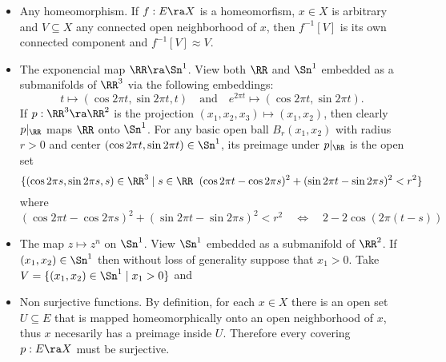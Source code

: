 \begin{examples*} $\;$\\%
\renewcommand{\labelitemi}{$\square$}
\begin{itemize}
\item Any homeomorphism. If $f:E\ra X$ is a homeomorfism, $x\in X$ is arbitrary and $V\subseteq X$ any
  connected open neighborhood of $x$, then $f^{-1}[V]$ is its own connected component and
  $f^{-1}[V]\approx V$.

\item The exponencial map $\RR\ra\Sn^1$.  View both $\RR$ and $\Sn^1$ embedded as a submanifolds of
  $\RR^3$ via the following embeddings:
  \[
    t \mapsto (\cos 2\pi t,\sin 2\pi t,t) \quad\text{and}\quad
    e^{2\pi t} \mapsto (\cos 2\pi t,\sin 2\pi t).
  \]
  If $p:\RR^3\ra\RR^2$ is the projection $(x_1,x_2,x_3)\mapsto(x_1,x_2)$, then clearly
  $p|_{\RR}$ maps $\RR$ onto $\Sn^1$. For any basic open ball $B_r(x_1,x_2)$ with radius
  $r>0$ and center $(\cos 2\pi t,\sin 2\pi t)\in\Sn^1$, its preimage under $p|_{\RR}$ is the open set
  \[
    \{(\cos2\pi s,\sin2\pi s,s)\in\RR^3 \mid
    s\in\RR\;\; (\cos2\pi t -\cos2\pi s)^2+(\sin2\pi t -\sin2\pi s)^2<r^2 \}
  \]
  where
  \[
    (\cos2\pi t -\cos2\pi s)^2+(\sin2\pi t -\sin2\pi s)^2<r^2 \quad\iff\quad
    2-2\cos(2\pi (t-s))
  \]
  
  
  
  
  
\item The map $z\mapsto z^n$ on $\Sn^1$. View $\Sn^1$ embedded as a submanifold of $\RR^2$. If
  $(x_1,x_2)\in\Sn^1$ then without loss of generality suppose that $x_1>0$. Take
  $V=\{(x_1,x_2)\in\Sn^1\mid x_1>0\}$ and 
\end{itemize}%

\renewcommand{\labelitemi}{$\boxtimes$}
\begin{itemize}
\item Non surjective functions. By definition, for each $x\in X$ there is an open set $U\subseteq E$
  that is mapped homeomorphically onto an open neighborhood of $x$, thus $x$ necesarily has a
  preimage inside $U$. Therefore every covering $p:E\ra X$ must be surjective.
\end{itemize}

  
\end{examples*}